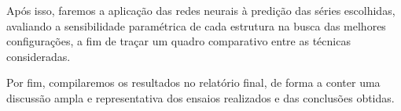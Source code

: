 \documentclass[a4paper, 12pt]{article}
\begin{document}
Após isso, faremos a aplicação das redes neurais à predição das séries escolhidas, avaliando a sensibilidade paramétrica de cada estrutura na busca das melhores configurações, a fim de traçar um quadro comparativo entre as técnicas consideradas. 

Por fim, compilaremos os resultados no relatório final, de forma a conter uma discussão ampla e representativa dos ensaios realizados e das conclusões obtidas. 





\end{document}
